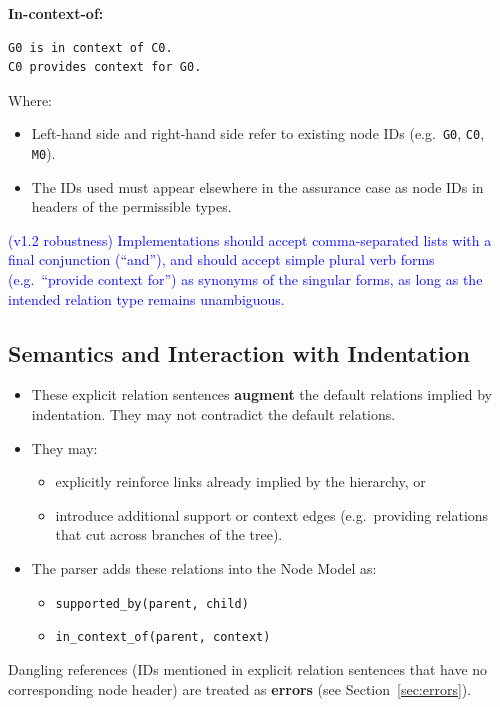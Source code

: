 \documentclass[11pt]{article}
\begin{document}
\textbf{In-context-of:}
\begin{verbatim}
G0 is in context of C0.
C0 provides context for G0.
\end{verbatim}

Where:
\begin{itemize}[leftmargin=2em]
  \item Left-hand side and right-hand side refer to existing node IDs (e.g.\ \texttt{G0}, \texttt{C0}, \texttt{M0}).
  \item The IDs used must appear elsewhere in the assurance case as node IDs in headers of the permissible types.
\end{itemize}

\textcolor{blue}{(v1.2 robustness) Implementations should accept comma-separated lists with a final conjunction (``and''), and should accept simple plural verb forms (e.g.\ ``provide context for'') as synonyms of the singular forms, as long as the intended relation type remains unambiguous.}

\subsection{Semantics and Interaction with Indentation}

\begin{itemize}[leftmargin=2em]
  \item These explicit relation sentences \textbf{augment} the default relations implied by indentation. They may not contradict the default relations.
  \item They may:
  \begin{itemize}[leftmargin=1.5em]
    \item explicitly reinforce links already implied by the hierarchy, or
    \item introduce additional support or context edges (e.g.\ providing relations that cut across branches of the tree).
  \end{itemize}
  \item The parser adds these relations into the Node Model as:
  \begin{itemize}[leftmargin=1.5em]
    \item \texttt{supported\_by(parent, child)}
    \item \texttt{in\_context\_of(parent, context)}
  \end{itemize}
\end{itemize}

Dangling references (IDs mentioned in explicit relation sentences that have no corresponding node header) are treated as \textbf{errors} (see Section~\ref{sec:errors}).
\end{document}
